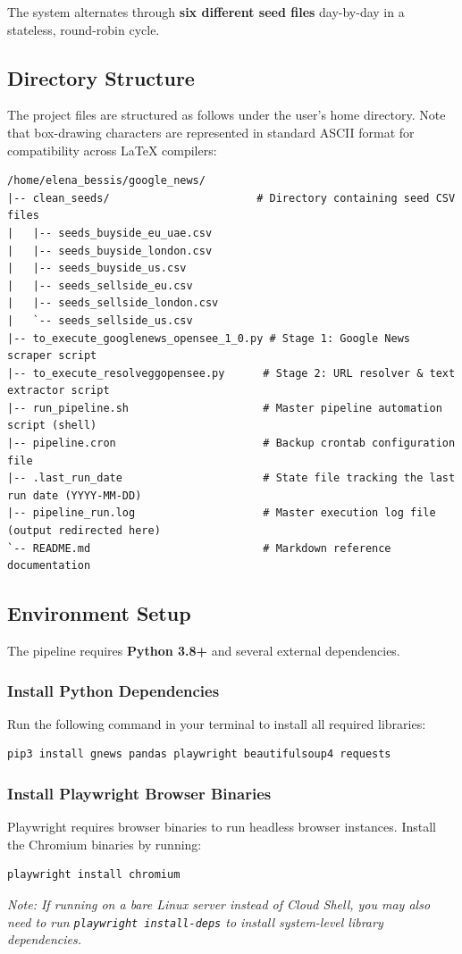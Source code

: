 \documentclass[11pt,a4paper]{article}
\begin{document}
The system alternates through \textbf{six different seed files} day-by-day in a stateless, round-robin cycle.

\subsection{Directory Structure}
The project files are structured as follows under the user's home directory. Note that box-drawing characters are represented in standard ASCII format for compatibility across LaTeX compilers:

\begin{lstlisting}[numbers=none, caption={Directory Structure of the Google News Pipeline}]
/home/elena_bessis/google_news/
|-- clean_seeds/                       # Directory containing seed CSV files
|   |-- seeds_buyside_eu_uae.csv
|   |-- seeds_buyside_london.csv
|   |-- seeds_buyside_us.csv
|   |-- seeds_sellside_eu.csv
|   |-- seeds_sellside_london.csv
|   `-- seeds_sellside_us.csv
|-- to_execute_googlenews_opensee_1_0.py # Stage 1: Google News scraper script
|-- to_execute_resolveggopensee.py      # Stage 2: URL resolver & text extractor script
|-- run_pipeline.sh                     # Master pipeline automation script (shell)
|-- pipeline.cron                       # Backup crontab configuration file
|-- .last_run_date                      # State file tracking the last run date (YYYY-MM-DD)
|-- pipeline_run.log                    # Master execution log file (output redirected here)
`-- README.md                           # Markdown reference documentation
\end{lstlisting}

\subsection{Environment Setup}
The pipeline requires \textbf{Python 3.8+} and several external dependencies.

\subsubsection{Install Python Dependencies}
Run the following command in your terminal to install all required libraries:
\begin{lstlisting}[style=bash]
pip3 install gnews pandas playwright beautifulsoup4 requests
\end{lstlisting}

\subsubsection{Install Playwright Browser Binaries}
Playwright requires browser binaries to run headless browser instances. Install the Chromium binaries by running:
\begin{lstlisting}[style=bash]
playwright install chromium
\end{lstlisting}
\textit{Note: If running on a bare Linux server instead of Cloud Shell, you may also need to run \texttt{playwright install-deps} to install system-level library dependencies.}
\end{document}
